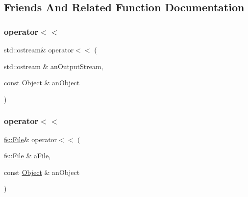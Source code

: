 \subsection{Friends And Related Function Documentation}
\mbox{\label{classlibrary_1_1core_1_1ctnr_1_1_object_a418df9bf4a73078f3d494edef1743f8d}} 
\subsubsection{\texorpdfstring{operator$<$$<$}{operator<<}\hspace{0.1cm}{\footnotesize\ttfamily [1/2]}}
{\footnotesize\ttfamily std\+::ostream\& operator$<$$<$ (\begin{DoxyParamCaption}\item[{std\+::ostream \&}]{an\+Output\+Stream,  }\item[{const \mbox{\hyperlink{classlibrary_1_1core_1_1ctnr_1_1_object}{Object}} \&}]{an\+Object }\end{DoxyParamCaption})\hspace{0.3cm}{\ttfamily [friend]}}

\mbox{\label{classlibrary_1_1core_1_1ctnr_1_1_object_af9350d4362cb9ad3424f4a6bb6d77a4c}} 
\subsubsection{\texorpdfstring{operator$<$$<$}{operator<<}\hspace{0.1cm}{\footnotesize\ttfamily [2/2]}}
{\footnotesize\ttfamily \mbox{\hyperlink{classlibrary_1_1core_1_1fs_1_1_file}{fs\+::\+File}}\& operator$<$$<$ (\begin{DoxyParamCaption}\item[{\mbox{\hyperlink{classlibrary_1_1core_1_1fs_1_1_file}{fs\+::\+File}} \&}]{a\+File,  }\item[{const \mbox{\hyperlink{classlibrary_1_1core_1_1ctnr_1_1_object}{Object}} \&}]{an\+Object }\end{DoxyParamCaption})\hspace{0.3cm}{\ttfamily [friend]}}

